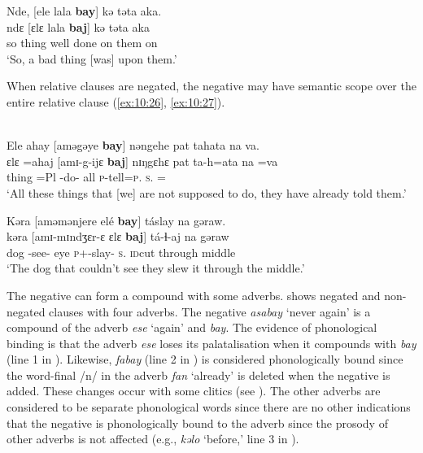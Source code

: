 \ea \label{ex:10:25}
Nde,  [ele  lala  \textbf{bay}]  kə  təta  aka.\\
\gll  ndɛ     [ɛlɛ   lala    \textbf{baj}]   kə   təta   aka\\
      so    thing  {well done}  {\NEG}  on  them  on\\
\glt  ‘So, a bad thing [was] upon them.’ 
\z

When relative clauses are negated, the negative may have semantic scope over the entire relative clause (\ref{ex:10:26}, \ref{ex:10:27}). 

\ea \label{ex:10:26}\\
Ele  ahay  [aməgəye  \textbf{bay}]  nəngehe  pat  tahata  na  va.\\
\gll  ɛlɛ     =ahaj  [amɪ-g-ijɛ   \textbf{baj}]  nɪŋgɛhɛ  pat  ta-h=ata  na  =va\\
      thing  =Pl  {\DEP}-do-{\CL}  {\NEG}  {\DEM}  all  \textsc{p}-tell=\textsc{p}.{\IO}  \textsc{s}.{\DO}  ={\PRF}\\
\glt  ‘All these things that [we] are not supposed to do, they have already told them.’  
\z

\ea \label{ex:10:27}
Kəra  [aməmənjere  elé  \textbf{bay}]  táslay  na  gəraw.\\
\gll  kəra    [amɪ-mɪndʒɛr-ɛ  ɛlɛ  \textbf{baj}]  tá-ɬ{}-aj    na  gəraw\\
      dog    {\DEP}-see-{\CL}  eye  {\NEG}  \textsc{p}+{\IFV}-slay{}-{\CL}    \textsc{s}.{\DO}  {\textsc{id}cut through middle}\\
\glt  ‘The dog that couldn’t see they slew it through the middle.’
\z

The negative can form a compound with some adverbs.  shows negated and non-negated clauses with four adverbs. The negative \textit{asabay} ‘never again’ is a compound of  the adverb \textit{ese} ‘again’ and \textit{bay}. The evidence of phonological binding is that the adverb \textit{ese}  loses its palatalisation when it compounds with \textit{bay} (line 1 in ). Likewise, \textit{fabay} (line 2 in ) is considered phonologically bound since the word-final /n/ in the adverb \textit{fan} ‘already’ is deleted when the negative is added. These changes occur with some clitics (see ). The other adverbs are considered to be separate phonological words since there are no other indications that the negative is phonologically bound to the adverb since the prosody of other adverbs is not affected (e.g., \textit{kəlo} ‘before,’ line 3 in ).  

